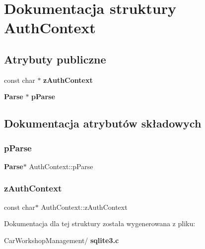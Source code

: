 \section{Dokumentacja struktury Auth\+Context}
\label{struct_auth_context}
\subsection*{Atrybuty publiczne}
\begin{DoxyCompactItemize}
\item 
const char $\ast$ \textbf{ z\+Auth\+Context}
\item 
\textbf{ Parse} $\ast$ \textbf{ p\+Parse}
\end{DoxyCompactItemize}


\subsection{Dokumentacja atrybutów składowych}
\mbox{\label{struct_auth_context_a8df2931d8f4facf59073c92315b00bfa}} 
\subsubsection{pParse}
{\footnotesize\ttfamily \textbf{ Parse}$\ast$ Auth\+Context\+::p\+Parse}

\mbox{\label{struct_auth_context_a1b095b152b72326476ac3f7edcaee78a}} 
\subsubsection{zAuthContext}
{\footnotesize\ttfamily const char$\ast$ Auth\+Context\+::z\+Auth\+Context}



Dokumentacja dla tej struktury została wygenerowana z pliku\+:\begin{DoxyCompactItemize}
\item 
Car\+Workshop\+Management/\textbf{ sqlite3.\+c}\end{DoxyCompactItemize}

